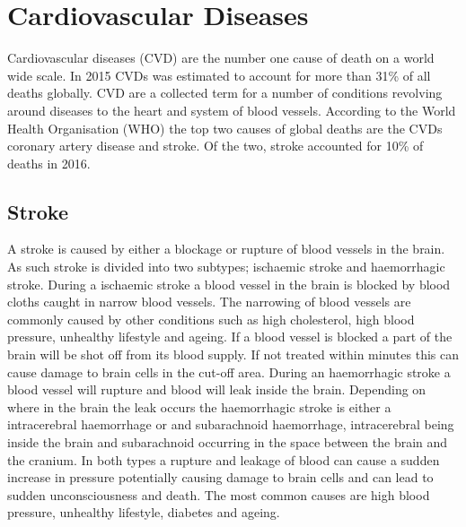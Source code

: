 
\section{Cardiovascular Diseases}

Cardiovascular diseases (CVD) are the number one cause of death on a world wide scale. In 2015 CVDs was estimated to account for more than 31\% of all deaths globally. \cite{whocvd2017} CVD are a collected term for a number of conditions revolving around diseases to the heart and system of blood vessels. According to the World Health Organisation (WHO) the top two causes of global deaths are the CVDs coronary artery disease and stroke. Of the two, stroke accounted for 10\% of deaths in 2016. \cite{whoMortalityStats2018}


\subsection{Stroke}
A stroke is caused by either a blockage or rupture of blood vessels in the brain. As such stroke is divided into two subtypes; ischaemic stroke and haemorrhagic stroke. During a ischaemic stroke a blood vessel in the brain is blocked by blood cloths caught in narrow blood vessels. The narrowing of blood vessels are commonly caused by other conditions such as high cholesterol, high blood pressure, unhealthy lifestyle and ageing. If a blood vessel is blocked a part of the brain will be shot off from its blood supply. If not treated within minutes this can cause damage to brain cells in the cut-off area. \cite{Mackay2002, Hering2017chap7, InternetStroke2018} 
During an haemorrhagic stroke a blood vessel will rupture and blood will leak inside the brain. Depending on where in the brain the leak occurs the haemorrhagic stroke is either a intracerebral haemorrhage or and subarachnoid haemorrhage, intracerebral being inside the brain and subarachnoid occurring in the space between the brain and the cranium. In both types a rupture and leakage of blood can cause a sudden increase in pressure potentially causing damage to brain cells and can lead to sudden unconsciousness and death. The most common causes are high blood pressure, unhealthy lifestyle, diabetes and ageing. \cite{Mackay2002, Hering2017chap8, InternetStroke2018}

